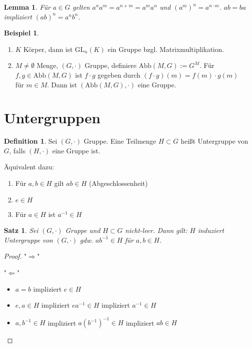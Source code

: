 \documentclass[12pt]{scrartcl}%
\newtheorem{thm}{Satz}
\newtheorem{lemma}{Lemma}
\theoremstyle{definition}
\newtheorem*{defn}{Definition}
\newtheorem{ex}{Beispiel}
\theoremstyle{remark}
\newcommand{\gl}{\text{GL}}
\newcommand{\abb}{\text{Abb}}
\newcommand{\inv}[1]{\left(#1\right)^{-1}}
\newcommand{\Inv}[1]{#1^{-1}}
\begin{document}
\begin{lemma}
    Für $a\in G$ gelten $a^n a^m=a^{n+m}=a^m a^n$ und $\left(a^m \right)^n = a^{n\cdot m}$.
    $ab=ba$ impliziert $\left(ab \right)^n = a^n b^n$.
\end{lemma}

\begin{ex}
    \begin{enumerate}
        \item $K$ Körper, dann ist $\gl_n(K)$ ein Gruppe bzgl. Matrixmultiplikation.
        \item $M\neq \emptyset$ Menge, $(G, \cdot)$ Gruppe, definiere $\abb(M,G):=G^M$. Für $f,g\in \abb(M,G)$ ist $f\cdot g$ gegeben durch $(f\cdot g)(m)=f(m)\cdot g(m)$ für $m\in M$. Dann ist $(\abb(M,G), \cdot)$ eine Gruppe.
    \end{enumerate}
\end{ex}



\section{Untergruppen}

\begin{defn}
    Sei $(G, \cdot)$ Gruppe. Eine Teilmenge $H\subset G$ heißt Untergruppe von $G$, falls $(H, \cdot)$ eine Gruppe ist.

    Äquivalent dazu:

    \begin{enumerate}[label=(\roman*)]
        \item Für $a,b\in H$ gilt $ab\in H$ (Abgeschlossenheit)
        \item $e\in H$
        \item Für $a\in H$ ist $\Inv a \in H$
    \end{enumerate}
\end{defn}

\begin{thm}
    Sei $(G, \cdot)$ Gruppe und $H\subset G$ nicht-leer. Dann gilt: $H$ induziert Untergruppe von $(G, \cdot)$ gdw. $a\Inv b\in H$ für $a,b\in H$.
\end{thm}

\begin{proof}
    "$\Rightarrow$" \checkmark

    "$\Leftarrow$" 
    \begin{itemize} 
        \item $a=b$ impliziert $e\in H$
        \item $e,a\in H$ impliziert $e\Inv a\in H$ impliziert $\Inv a \in H$
        \item $a,\Inv b\in H$ impliziert $a\inv{\Inv b} \in H$ impliziert $ab\in H$ \qedhere
    \end{itemize}
\end{proof}
\end{document}

